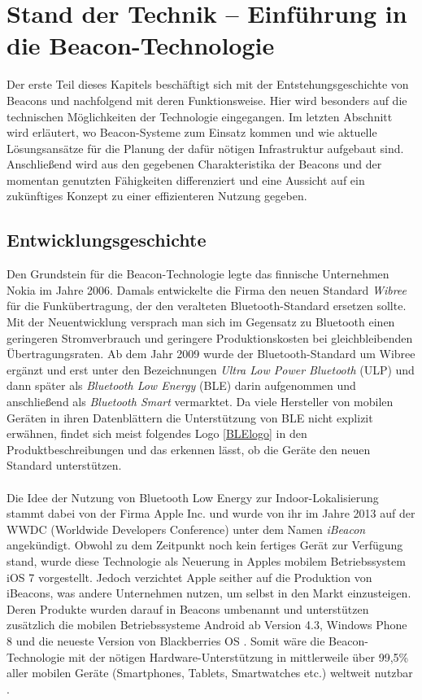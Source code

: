 \chapter{Stand der Technik -- Einführung in die Beacon-Technologie}
Der erste Teil dieses Kapitels beschäftigt sich mit der Entstehungsgeschichte von Beacons und nachfolgend mit deren Funktionsweise. Hier wird besonders auf die technischen Möglichkeiten der Technologie eingegangen. Im letzten Abschnitt wird erläutert, wo Beacon-Systeme zum Einsatz kommen und wie aktuelle Lösungsansätze für die Planung der dafür nötigen Infrastruktur aufgebaut sind. Anschließend wird aus den gegebenen Charakteristika der Beacons und der momentan genutzten Fähigkeiten differenziert und eine Aussicht auf ein zukünftiges Konzept zu einer effizienteren Nutzung gegeben.
\section{Entwicklungsgeschichte}
Den Grundstein für die Beacon-Technologie legte das finnische Unternehmen Nokia im Jahre 2006. Damals entwickelte die Firma den neuen Standard \textit{Wibree} für die Funkübertragung, der den veralteten Bluetooth-Standard ersetzen sollte. Mit der Neuentwicklung versprach man sich im Gegensatz zu Bluetooth einen geringeren Stromverbrauch und geringere Produktionskosten bei gleichbleibenden Übertragungsraten. Ab dem Jahr 2009 wurde der Bluetooth-Standard um Wibree ergänzt und erst unter den Bezeichnungen \textit{Ultra Low Power Bluetooth} (ULP) und dann später als \textit{Bluetooth Low Energy} (BLE) darin aufgenommen \cite{Wib2BLE} und anschließend als \textit{Bluetooth Smart} vermarktet. Da viele Hersteller von mobilen Geräten in ihren Datenblättern die Unterstützung von BLE nicht explizit erwähnen, findet sich meist folgendes Logo \ref{BLElogo} in den Produktbeschreibungen und das erkennen lässt, ob die Geräte den neuen Standard unterstützen. \\ \\
Die Idee der Nutzung von Bluetooth Low Energy zur Indoor-Lokalisierung stammt dabei von der Firma Apple Inc. und wurde von ihr im Jahre 2013 auf der WWDC (Worldwide Developers Conference)\cite{Apple} unter dem Namen \textit{iBeacon} angekündigt. Obwohl zu dem Zeitpunkt noch kein fertiges Gerät zur Verfügung stand, wurde diese Technologie als Neuerung in Apples mobilem Betriebssystem iOS 7 vorgestellt. Jedoch verzichtet Apple seither auf die Produktion von iBeacons, was andere Unternehmen nutzen, um selbst in den Markt einzusteigen. Deren Produkte wurden darauf in Beacons umbenannt und unterstützen zusätzlich die mobilen Betriebssysteme Android ab Version 4.3, Windows Phone 8 und die neueste Version von Blackberries OS \cite{Bibel}. Somit wäre die Beacon-Technologie mit der nötigen Hardware-Unterstützung in mittlerweile über 99,5\% aller mobilen Geräte (Smartphones, Tablets, Smartwatches etc.) weltweit nutzbar \cite{MobGerSt}. \par\bigskip
